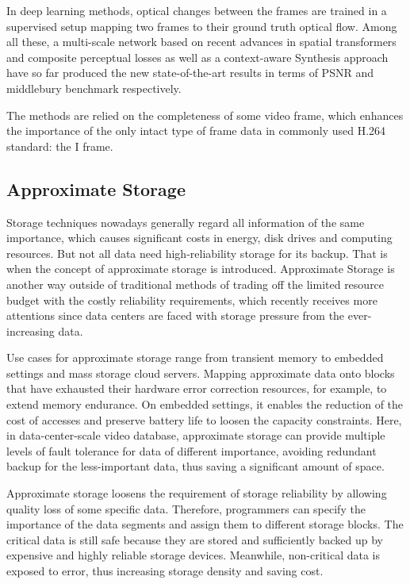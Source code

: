 \documentclass[sigconf]{acmart}
\begin{document}
In deep learning methods, optical changes between the frames are trained in a supervised setup mapping two frames to their ground truth optical flow. Among all these, a multi-scale network\cite{van2017frame} based on recent advances in spatial transformers and composite perceptual losses as well as a context-aware Synthesis approach\cite{niklaus2018context} have so far produced the new state-of-the-art results in terms of PSNR and middlebury benchmark respectively.


The methods are relied on the completeness of some video frame, which enhances the importance of the only intact type of frame data in commonly used H.264 standard: the I frame.


\subsection{Approximate Storage}
Storage techniques nowadays generally regard all information of the same importance, which causes significant costs in energy, disk drives and computing resources. But not all data need high-reliability storage for its backup. That is when the concept of approximate storage is introduced. Approximate Storage is another way outside of traditional methods of trading off the limited resource budget with the costly reliability requirements, which recently receives more attentions since data centers are faced with storage pressure from the ever-increasing data.

Use cases for approximate storage range from transient memory to embedded settings and mass storage cloud servers. Mapping approximate data onto blocks that have exhausted their hardware error correction resources, for example, to extend memory endurance. On embedded settings, it enables the reduction of the cost of accesses and preserve battery life to loosen the capacity constraints. \cite{sampson2014approximate} Here, in data-center-scale video database, approximate storage can provide multiple levels of fault tolerance for data of different importance, avoiding redundant backup for the less-important data, thus saving a significant amount of space.


Approximate storage loosens the requirement of storage reliability by allowing quality loss of some specific data. Therefore, programmers can specify the importance of the data segments and assign them to different storage blocks. The critical data is still safe because they are stored and sufficiently backed up by expensive and highly reliable storage devices. Meanwhile, non-critical data is exposed to error, thus increasing storage density and saving cost.
\end{document}
